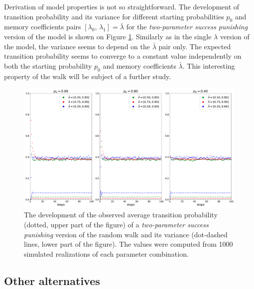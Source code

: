 \documentclass{amsart}
\theoremstyle{definition}
\theoremstyle{plain}
\theoremstyle{plain}
\theoremstyle{plain}
\numberwithin{equation}{section}
\begin{document}
    Derivation of model properties is not so straightforward.
    The development
    of transition probability and its variance for different starting
    probabilities $p_{0}$ and memory coefficients pairs $ [\lambda_{0},\,\lambda_{1}]=\bar{\lambda}$
    for the \emph{two-parameter success punishing} version of the model
    is shown on Figure \ref{fig:Development-punish2l}.
    Similarly as in
    the single $\lambda$ version of the model, the variance seems to
    depend on the $\bar{\lambda}$ pair only.
    The expected transition
    probability seems to converge to a constant value independently on
    both the starting probability $p_{0}$ and memory coefficients $\bar{\lambda}$.
    This interesting property of the walk will be subject of a further study.

    \begin{figure}
        \begin{center}
            \includegraphics[width=1\textwidth]{../simulations/e_probability_1000_walks_100_steps_type_success_punished_two_lambdas}
            \caption{\label{fig:Development-punish2l}The development of the observed average
            transition probability (dotted, upper part of the figure) of a \emph{two-parameter success
            punishing} version of the random walk and its variance (dot-dashed lines, lower part of the figure).
            The values
            were computed from 1000 simulated realizations of each parameter
            combination.}
        \end{center}
    \end{figure}

    \subsection{Other alternatives}\label{subsec:other-alternatives}
\end{document}
